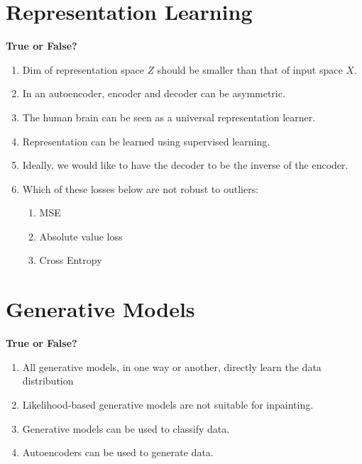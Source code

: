 \documentclass{report}
\numberwithin{equation}{section}
\begin{document}
\section{Representation Learning}
\textbf{True or False?}
\begin{enumerate}
    \item Dim of representation space $Z$ should be smaller than that of input space $X$. 
    \item In an autoencoder, encoder and decoder can be asymmetric. 
    \item The human brain can be seen as a universal representation learner. 
    \item Representation can be learned using supervised learning. 
    \item Ideally, we would like to have the decoder to be the inverse of the encoder. 
    \item Which of these losses below are not robust to outliers:
    \begin{enumerate}[label=\alph*.]
        \item MSE
        \item Absolute value loss
        \item Cross Entropy
    \end{enumerate}
\end{enumerate}

\section{Generative Models}
\textbf{True or False?}
\begin{enumerate}
    \item All generative models, in one way or another, directly learn the data distribution 
    \item Likelihood-based generative models are not suitable for inpainting. 
    \item Generative models can be used to classify data. 
    \item Autoencoders can be used to generate data. 
\end{enumerate}
\end{document}
